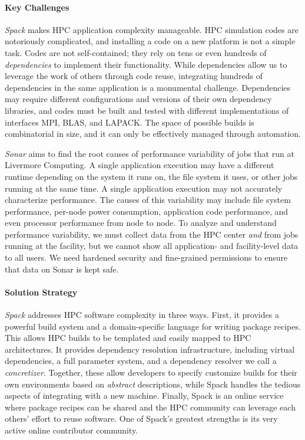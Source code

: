 \paragraph{Key  Challenges}
{\it Spack} makes HPC application complexity manageable. HPC simulation
codes are notoriously complicated, and installing a code on a new
platform is not a simple task.  Codes are not self-contained; they rely
on tens or even hundreds of {\it dependencies} to implement their
functionality. While dependencies allow us to leverage the work of others
through code reuse, integrating hundreds of dependencies in the same
application is a monumental challenge.  Dependencies may require
different configurations and versions of their own dependency libraries,
and codes must be built and tested with different implementations of
interfaces MPI, BLAS, and LAPACK. The space of possible builds is
combinatorial in size, and it can only be effectively managed through
automation.

{\it Sonar} aims to find the root causes of performance variability of
jobs that run at Livermore Computing.  A single application execution may
have a different runtime depending on the system it runs on, the file
system it uses, or other jobs running at the same time.  A single
application execution may not accurately characterize performance.  The
causes of this variability may include file system performance, per-node
power consumption, application code performance, and even processor
performance from node to node. To analyze and understand performance
variability, we must collect data from the HPC center {\it and} from jobs
running at the facility, but we cannot show all application- and
facility-level data to all users. We need hardened security and
fine-grained permissions to ensure that data on Sonar is kept safe.

\paragraph{Solution Strategy}
{\it Spack} addresses HPC software complexity in three ways. First, it
provides a powerful build system and a domain-specific language for
writing package recipes.  This allows HPC builds to be templated and
easily mapped to HPC architectures. It provides dependency resolution
infrastructure, including virtual dependencies, a full parameter system,
and a dependency resolver we call a {\it concretizer}. Together, these
allow developers to specify customize builds for their own environments
based on {\it abstract} descriptions, while Spack handles the tedious
aspects of integrating with a new machine. Finally, Spack is an online
service where package recipes can be shared and the HPC community can
leverage each others' effort to reuse software. One of Spack's greatest
strengths is its very active online contributor community.

